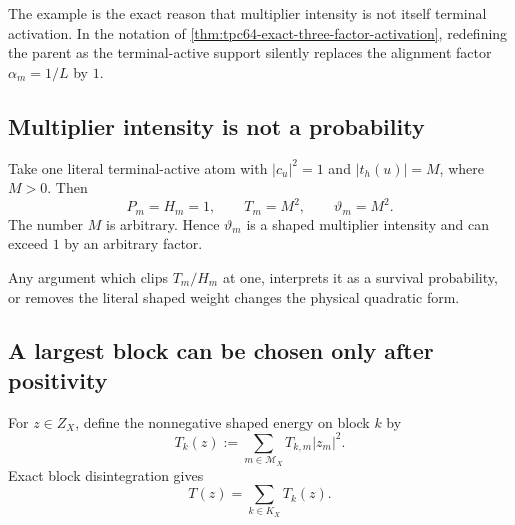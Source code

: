 The example is the exact reason that multiplier intensity is not itself
terminal activation.  In the notation of
\cref{thm:tpc64-exact-three-factor-activation}, redefining the parent as
the terminal-active support silently replaces the alignment factor
\(\alpha_m=1/L\) by \(1\).

\subsection{Multiplier intensity is not a probability}

\begin{example}
\label{ex:tpc64-unbounded-multiplier-intensity}
Take one literal terminal-active atom with \(|c_u|^2=1\) and
\(|t_h(u)|=M\), where \(M>0\).  Then
\begin{equation}
 P_m=H_m=1,\qquad
 T_m=M^2,\qquad
 \vartheta_m=M^2.
 \label{eq:tpc64-unbounded-intensity-data}
\end{equation}
The number \(M\) is arbitrary.  Hence \(\vartheta_m\) is a shaped
multiplier intensity and can exceed \(1\) by an arbitrary factor.
\end{example}

Any argument which clips \(T_m/H_m\) at one, interprets it as a survival
probability, or removes the literal shaped weight changes the physical
quadratic form.

\subsection{A largest block can be chosen only after positivity}

For \(z\in Z_X\), define the nonnegative shaped energy on block \(k\) by
\begin{equation}
 T_k(z):=\sum_{m\in\mathcal M_X}T_{k,m}|z_m|^2.
 \label{eq:tpc64-block-terminal-form}
\end{equation}
Exact block disintegration gives
\begin{equation}
 T(z)=\sum_{k\in K_X}T_k(z).
 \label{eq:tpc64-terminal-block-sum}
\end{equation}

